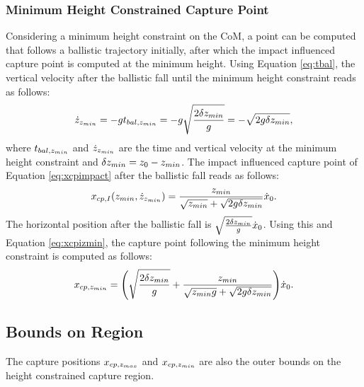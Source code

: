 \subsubsection{Minimum Height Constrained Capture Point} 
Considering a minimum height constraint on the \ac{CoM}, a point can be computed that follows a ballistic trajectory initially, after which the impact influenced capture point is computed at the minimum height. Using Equation \eqref{eq:tbal}, the vertical velocity after the ballistic fall until the minimum height constraint reads as follows:
\begin{equation}
	\dot{z}_{z_{min}} = -gt_{bal,z_{min}} = -g\sqrt{\frac{2\delta{z_{min}}}{g}} = -\sqrt{2g\delta{z_{min}}},
\end{equation}
where $t_{bal,z_{min}}$ and $\dot{z}_{z_{min}}$ are the time and vertical velocity at the minimum height constraint and $\delta{z_{min}}=z_0-z_{min}$. The impact influenced capture point of Equation \eqref{eq:xcpimpact} after the ballistic fall reads as follows:
\begin{equation}
\label{eq:xcpizmin}
	x_{cp,I}(z_{min}, \dot{z}_{z_{min}})= \frac{z_{min}}{\sqrt{z_{min}}+\sqrt{2g\delta{z_{min}}}}\dot{x}_0.
\end{equation} 
The horizontal position after the ballistic fall is $\sqrt{\frac{2\delta z_{min}}{g}}\dot{x}_0$. Using this and Equation \eqref{eq:xcpizmin}, the capture point following the minimum height constraint is computed as follows:
\begin{equation}
 x_{cp,z_{min}}=\Bigg(\sqrt{\frac{2\delta{z_{min}}}{g}} +\frac{z_{min}}{\sqrt{z_{min} g}+\sqrt{2g\delta{z_{min}}}}\Bigg)\dot{x}_0.
\end{equation}

\subsection{Bounds on Region}
The capture positions $x_{cp,z_{max}}$ and $x_{cp,z_{min}}$ are also the outer bounds on the height constrained capture region.


